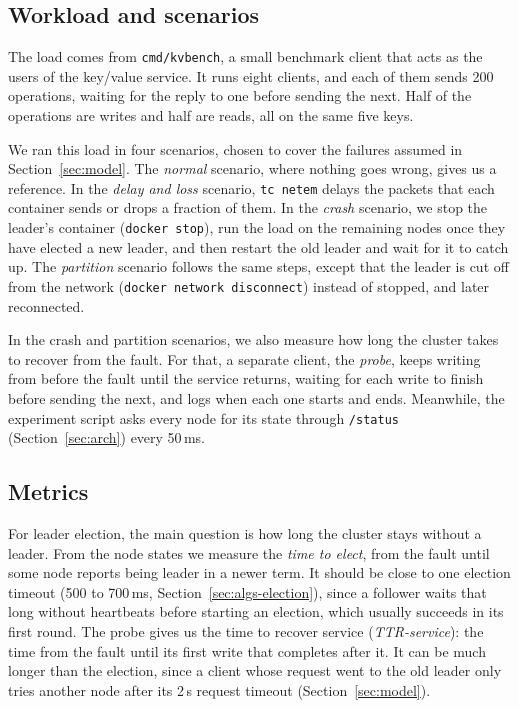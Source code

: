 \documentclass[conference]{IEEEtran}
\begin{document}
\subsection{Workload and scenarios}\label{sec:method-scenarios}
The load comes from \texttt{cmd/kvbench}, a small benchmark client that acts as the users of the key/value service. It runs eight clients, and each of them sends 200 operations,
waiting for the reply to one before sending the next. Half of the operations are writes and half are reads, all on the same five keys.

We ran this load in four scenarios, chosen to cover the failures assumed in Section~\ref{sec:model}. The \emph{normal} scenario, where nothing goes wrong, gives us a reference.
In the \emph{delay and loss} scenario, \texttt{tc netem} delays the packets that each container sends or drops a fraction of them. In the \emph{crash} scenario,
we stop the leader's container (\texttt{docker stop}), run the load on the remaining nodes once they have elected a new leader, and then restart the old leader and wait for it to catch up.
The \emph{partition} scenario follows the same steps, except that the leader is cut off from the network (\texttt{docker network disconnect}) instead of stopped, and later reconnected.

In the crash and partition scenarios, we also measure how long the cluster takes to recover from the fault. For that, a separate client, the \emph{probe},
keeps writing from before the fault until the service returns, waiting for each write to finish before sending the next, and logs when each one starts and ends. Meanwhile,
the experiment script asks every node for its state through \texttt{/status} (Section~\ref{sec:arch}) every 50\,ms.

\subsection{Metrics}\label{sec:method-metrics}
For leader election, the main question is how long the cluster stays without a leader. From the node states we measure the \emph{time to elect},
from the fault until some node reports being leader in a newer term. It should be close to one election timeout (500 to 700\,ms, Section~\ref{sec:algs-election}),
since a follower waits that long without heartbeats before starting an election, which usually succeeds in its first round. The probe gives us the time to recover service (\emph{TTR-service}):
the time from the fault until its first write that completes after it. It can be much longer than the election,
since a client whose request went to the old leader only tries another node after its 2\,s request timeout (Section~\ref{sec:model}).
\end{document}
